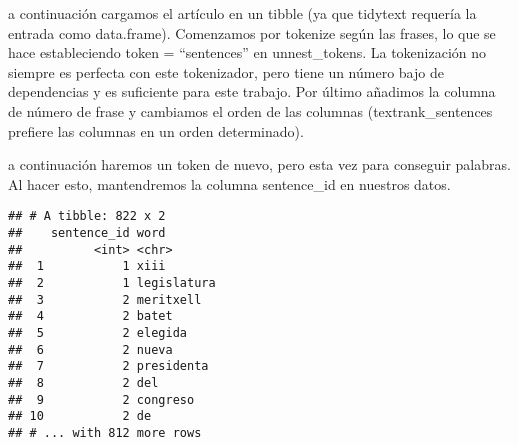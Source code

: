 \documentclass[]{article}
\newenvironment{Shaded}{\begin{snugshade}}{\end{snugshade}}
\newcommand{\KeywordTok}[1]{\textcolor[rgb]{0.13,0.29,0.53}{\textbf{#1}}}
\newcommand{\DataTypeTok}[1]{\textcolor[rgb]{0.13,0.29,0.53}{#1}}
\newcommand{\StringTok}[1]{\textcolor[rgb]{0.31,0.60,0.02}{#1}}
\newcommand{\OtherTok}[1]{\textcolor[rgb]{0.56,0.35,0.01}{#1}}
\newcommand{\OperatorTok}[1]{\textcolor[rgb]{0.81,0.36,0.00}{\textbf{#1}}}
\newcommand{\NormalTok}[1]{#1}
\begin{document}
a continuación cargamos el artículo en un tibble (ya que tidytext
requería la entrada como data.frame). Comenzamos por tokenize según las
frases, lo que se hace estableciendo token = ``sentences'' en
unnest\_tokens. La tokenización no siempre es perfecta con este
tokenizador, pero tiene un número bajo de dependencias y es suficiente
para este trabajo. Por último añadimos la columna de número de frase y
cambiamos el orden de las columnas (textrank\_sentences prefiere las
columnas en un orden determinado).

\begin{Shaded}
\end{Shaded}

a continuación haremos un token de nuevo, pero esta vez para conseguir
palabras. Al hacer esto, mantendremos la columna sentence\_id en
nuestros datos.

\begin{Shaded}
\end{Shaded}

\begin{verbatim}
## # A tibble: 822 x 2
##    sentence_id word       
##          <int> <chr>      
##  1           1 xiii       
##  2           1 legislatura
##  3           2 meritxell  
##  4           2 batet      
##  5           2 elegida    
##  6           2 nueva      
##  7           2 presidenta 
##  8           2 del        
##  9           2 congreso   
## 10           2 de         
## # ... with 812 more rows
\end{verbatim}

\begin{Shaded}
\end{Shaded}
\end{document}
